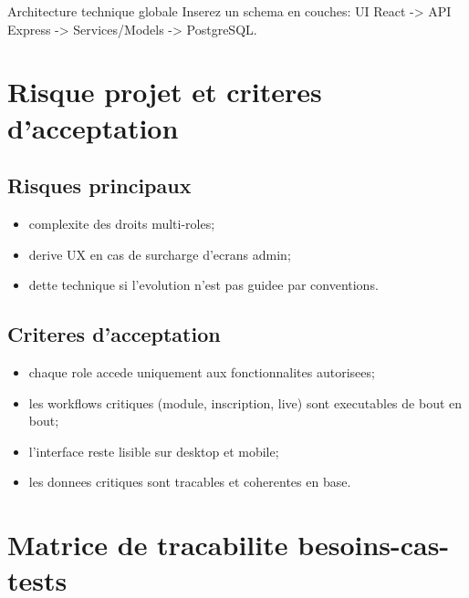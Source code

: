 ﻿\documentclass[12pt,a4paper,oneside]{report}
\begin{document}
\begin{figurebox}{Architecture technique globale}
Inserez un schema en couches: UI React -> API Express -> Services/Models -> PostgreSQL.
\end{figurebox}

\section{Risque projet et criteres d'acceptation}

\subsection{Risques principaux}

\begin{itemize}
  \item complexite des droits multi-roles;
  \item derive UX en cas de surcharge d'ecrans admin;
  \item dette technique si l'evolution n'est pas guidee par conventions.
\end{itemize}

\subsection{Criteres d'acceptation}

\begin{itemize}
  \item chaque role accede uniquement aux fonctionnalites autorisees;
  \item les workflows critiques (module, inscription, live) sont executables de bout en bout;
  \item l'interface reste lisible sur desktop et mobile;
  \item les donnees critiques sont tracables et coherentes en base.
\end{itemize}

\section{Matrice de tracabilite besoins-cas-tests}
\end{document}
